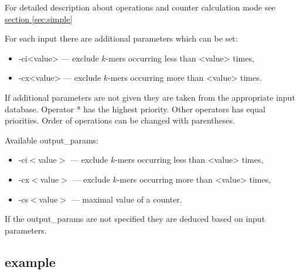 For detailed description about operations and counter calculation mode see \hyperref[sec:simple]{section \ref{sec:simple}}

For each input there are additional parameters which can be set:
\begin{itemize}
	\item \textsf{-ci<value>} --- exclude $k$-mers occurring less than <value> times,
	\item \textsf{-cx<value>} --- exclude $k$-mers occurring more than <value> times.	
\end{itemize}

If additional parameters are not given they are taken from the appropriate input database. 
Operator \textsf{*} has the highest priority. Other operators has equal priorities. Order of operations can be changed with parentheses.

Available \textsf{output\_params}:
\begin{itemize}
	\item \textsf{-ci$<$value$>$} --- exclude $k$-mers occurring less than <value> times,
	\item \textsf{-cx$<$value$>$} --- exclude $k$-mers occurring more than <value> times,
	\item \textsf{-cs$<$value$>$} --- maximal value of a counter.
\end{itemize}
If the \textsf{output\_params} are not specified they are deduced based on input parameters.
\subsection*{example}
\\ \\
